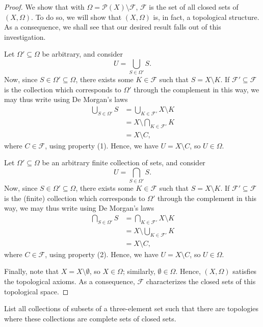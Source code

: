 \begin{proof}
    We show that with $\Omega = \mathcal{P}(X) \setminus \mathcal{F}$,
    $\mathcal{F}$ is the set of all closed sets of $(X, \Omega)$.  To do so, we
    will show that $(X, \Omega)$ is, in fact, a topological structure. As a
    consequence, we shall see that our desired result falls out of this
    investigation.

    Let $\Omega' \subseteq \Omega$ be arbitrary, and consider
    \[
        U = \bigcup_{S \in \Omega'} S.
    \]
    Now, since $S \in \Omega' \subseteq \Omega$, there exists some $K \in
    \mathcal{F}$ such that $S = X \setminus K$. If $\mathcal{F}' \subseteq
    \mathcal{F}$ is the collection which corresponds to $\Omega'$ through
    the complement in this way, we may thus write using De Morgan's laws
    \begin{align*}
        \bigcup_{S \in \Omega'} S &= \bigcup_{K \in \mathcal{F}'} X \setminus K
        \\
        &= X \setminus \bigcap_{K \in \mathcal{F}'} K \\
        &= X \setminus C,
    \end{align*}
    where $C \in \mathcal{F}$, using property (1). Hence, we have $U = X
    \setminus C$, so $U \in \Omega$.

    Let $\Omega' \subseteq \Omega$ be an arbitrary finite collection of sets,
    and consider 
    \[
        U = \bigcap_{S \in \Omega'} S.
    \]
    Now, since $S \in \Omega' \subseteq \Omega$, there exists some $K \in
    \mathcal{F}$ such that $S = X \setminus K$. If $\mathcal{F}' \subseteq
    \mathcal{F}$ is the (finite) collection which corresponds to $\Omega'$
    through the complement in this way, we may thus write using De Morgan's laws
    \begin{align*}
        \bigcap_{S \in \Omega'} S &= \bigcap_{K \in \mathcal{F}'} X \setminus K
        \\
        &= X \setminus \bigcup_{K \in \mathcal{F}'} K \\
        &= X \setminus C,
    \end{align*}
    where $C \in \mathcal{F}$, using property (2). Hence, we have $U = X
    \setminus C$, so $U \in \Omega$.

    Finally, note that $X = X \setminus \emptyset$, so $X \in \Omega$;
    similarly, $\emptyset \in \Omega$. Hence, $(X, \Omega)$ satisfies the
    topological axioms. As a consequence, $\mathcal{F}$ characterizes the closed
    sets of this topological space.
\end{proof}

\begin{minorEx}
    List all collections of subsets of a three-element set such that there are
    topologies where these collections are complete sets of closed sets.
\end{minorEx}
